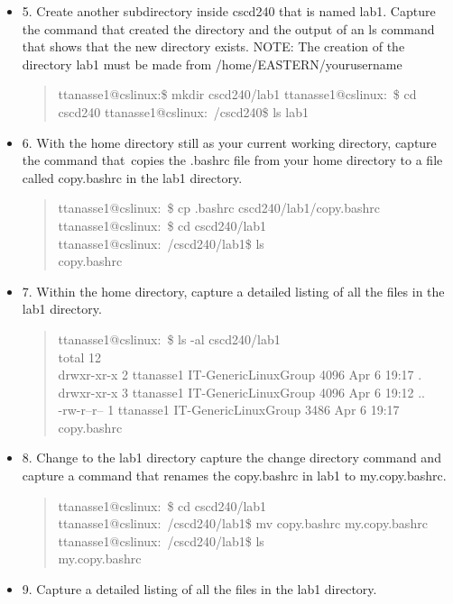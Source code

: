 \documentclass{article}
\begin{document}
\begin{itemize}
  \item 5. Create another subdirectory inside cscd240 that is named lab1. Capture the command that created the directory and the output of an ls command that shows that the new directory exists. NOTE: The creation of the directory lab1 must be made from /home/EASTERN/yourusername
  \begin{quote}
    ttanasse1@cslinux:\$ mkdir cscd240/lab1
ttanasse1@cslinux:~\$ cd cscd240
ttanasse1@cslinux:~/cscd240\$ ls
lab1
  \end{quote}
  \item 6. With the home directory still as your current working directory, capture the command that copies the .bashrc file from your home directory to a file called copy.bashrc in the lab1 directory.
  \begin{quote}
    ttanasse1@cslinux:~\$ cp .bashrc cscd240/lab1/copy.bashrc\\
ttanasse1@cslinux:~\$ cd cscd240/lab1\\
ttanasse1@cslinux:~/cscd240/lab1\$ ls\\
copy.bashrc
  \end{quote}
  \item 7. Within the home directory, capture a detailed listing of all the files in the lab1 directory.
  \begin{quote}
    ttanasse1@cslinux:~\$ ls -al cscd240/lab1\\
    total 12\\
    drwxr-xr-x 2 ttanasse1 IT-GenericLinuxGroup 4096 Apr  6 19:17 .\\
    drwxr-xr-x 3 ttanasse1 IT-GenericLinuxGroup 4096 Apr  6 19:12 ..\\
    -rw-r--r-- 1 ttanasse1 IT-GenericLinuxGroup 3486 Apr  6 19:17 copy.bashrc
  \end{quote}
  \item 8. Change to the lab1 directory capture the change directory command and capture a command that renames the copy.bashrc in lab1 to my.copy.bashrc. 
  \begin{quote}
    ttanasse1@cslinux:~\$ cd cscd240/lab1\\
ttanasse1@cslinux:~/cscd240/lab1\$ mv copy.bashrc my.copy.bashrc\\
ttanasse1@cslinux:~/cscd240/lab1\$ ls\\
my.copy.bashrc
  \end{quote}
  \item9. Capture a detailed listing of all the files in the lab1 directory.
  \begin{quote}

\end{quote}
\end{itemize}
\end{document}
